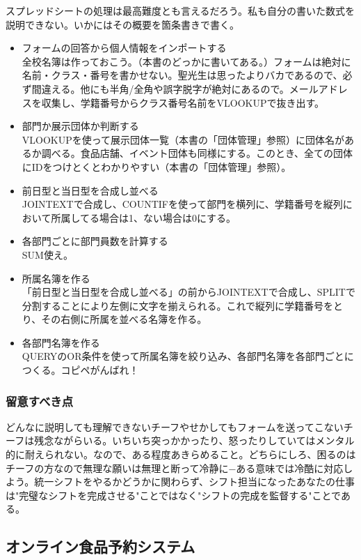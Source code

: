 \documentclass[dvipdfmx,jb5]{jarticle}
\begin{document}
 スプレッドシートの処理は最高難度とも言えるだろう。私も自分の書いた数式を説明できない。いかにはその概要を箇条書きで書く。
   \begin{itemize}
  \item フォームの回答から個人情報をインポートする\\
  全校名簿は作っておこう。（本書のどっかに書いてある。）フォームは絶対に名前・クラス・番号を書かせない。聖光生は思ったよりバカであるので、必ず間違える。他にも半角/全角や誤字脱字が絶対にあるので。メールアドレスを収集し、学籍番号からクラス番号名前をVLOOKUPで抜き出す。
   \item 部門か展示団体か判断する\\
 VLOOKUPを使って展示団体一覧（本書の「団体管理」参照）に団体名があるか調べる。食品店舗、イベント団体も同様にする。このとき、全ての団体にIDをつけとくとわかりやすい（本書の「団体管理」参照）。
  \item 前日型と当日型を合成し並べる\\
  JOINTEXTで合成し、COUNTIFを使って部門を横列に、学籍番号を縦列において所属してる場合は1、ない場合は0にする。
  \item 各部門ごとに部門員数を計算する\\
  SUM使え。
  \item 所属名簿を作る\\
  「前日型と当日型を合成し並べる」の前からJOINTEXTで合成し、SPLITで分割することにより左側に文字を揃えられる。これで縦列に学籍番号をとり、その右側に所属を並べる名簿を作る。
   \item 各部門名簿を作る\\
   QUERYのOR条件を使って所属名簿を絞り込み、各部門名簿を各部門ごとにつくる。コピペがんばれ！
  \end{itemize}

  \subsubsection{留意すべき点}
  どんなに説明しても理解できないチーフやせかしてもフォームを送ってこないチーフは残念ながらいる。いちいち突っかかったり、怒ったりしていてはメンタル的に耐えられない。なので、ある程度あきらめること。どちらにしろ、困るのはチーフの方なので無理な願いは無理と断って冷静に−ある意味では冷酷に対応しよう。統一シフトをやるかどうかに関わらず、シフト担当になったあなたの仕事は"完璧なシフトを完成させる"ことではなく"シフトの完成を監督する"ことである。

 \subsection{オンライン食品予約システム}\label{sec:オンライン食品予約システム}
\end{document}
